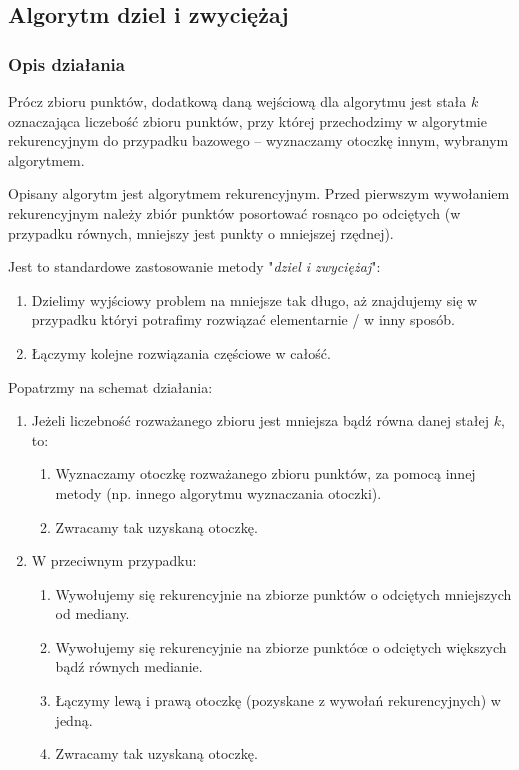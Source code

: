 \documentclass[11pt]{article}
\theoremstyle{remark} \newtheorem{definition}{def.}
\theoremstyle{definition} \newtheorem{twierdzenie}{tw.}
\begin{document}
\medskip

\subsection{Algorytm dziel i zwyciężaj}
    \subsubsection{Opis działania}
    Prócz zbioru punktów, dodatkową daną wejściową dla algorytmu jest stała $k$ oznaczająca liczebość zbioru punktów, przy której przechodzimy w algorytmie 
    rekurencyjnym do przypadku bazowego -- wyznaczamy otoczkę innym, wybranym algorytmem.
    
    Opisany algorytm jest algorytmem rekurencyjnym. Przed pierwszym wywołaniem rekurencyjnym należy zbiór punktów posortować 
    rosnąco po odciętych (w przypadku równych, mniejszy jest punkty o mniejszej rzędnej). 
   
    Jest to standardowe zastosowanie metody "\emph{dziel i zwyciężaj}": 
    \begin{enumerate}
        \item   Dzielimy wyjściowy problem na mniejsze tak długo, aż znajdujemy się w przypadku któryi potrafimy rozwiązać elementarnie / w inny sposób.
        \item   Łączymy kolejne rozwiązania częściowe w całość. 
    \end{enumerate}


    Popatrzmy na schemat działania:

    \begin{enumerate}
        \item   Jeżeli liczebność rozważanego zbioru jest mniejsza bądź równa danej stałej $k$, to:
                \begin{enumerate}
                    \item   Wyznaczamy otoczkę rozważanego zbioru punktów, za pomocą innej metody (np. innego algorytmu wyznaczania otoczki).
                    \item   Zwracamy tak uzyskaną otoczkę.
                \end{enumerate}
        \item   W przeciwnym przypadku:
                \begin{enumerate}
                    \item   Wywołujemy się rekurencyjnie na zbiorze punktów o odciętych mniejszych od mediany.
                    \item   Wywołujemy się rekurencyjnie na zbiorze punktóœ o odciętych większych bądź równych medianie.
                    \item   Łączymy lewą i prawą otoczkę (pozyskane z wywołań rekurencyjnych) w jedną. 
                    \item   Zwracamy tak uzyskaną otoczkę.
                \end{enumerate}
    \end{enumerate}
\end{document}
